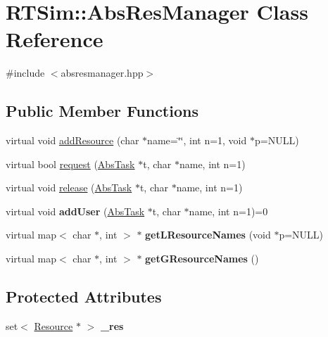 \hypertarget{classRTSim_1_1AbsResManager}{}\section{R\+T\+Sim\+:\+:Abs\+Res\+Manager Class Reference}
\label{classRTSim_1_1AbsResManager}


{\ttfamily \#include $<$absresmanager.\+hpp$>$}

\subsection*{Public Member Functions}
\begin{DoxyCompactItemize}
\item 
virtual void \hyperlink{classRTSim_1_1AbsResManager_ae4067854544315e2253f1ef5b3b10d3c}{add\+Resource} (char $\ast$name=\char`\"{}\char`\"{}, int n=1, void $\ast$p=N\+U\+LL)
\item 
virtual bool \hyperlink{classRTSim_1_1AbsResManager_aa1515da6c3b530ba663d694c693071e3}{request} (\hyperlink{classRTSim_1_1AbsTask}{Abs\+Task} $\ast$t, char $\ast$name, int n=1)
\item 
virtual void \hyperlink{classRTSim_1_1AbsResManager_a1caf3de13a3e1ac01f4f626b5ab4909d}{release} (\hyperlink{classRTSim_1_1AbsTask}{Abs\+Task} $\ast$t, char $\ast$name, int n=1)
\item 
virtual void {\bfseries add\+User} (\hyperlink{classRTSim_1_1AbsTask}{Abs\+Task} $\ast$t, char $\ast$name, int n=1)=0\hypertarget{classRTSim_1_1AbsResManager_a26c2989184847b41229aebdbc62a2ca9}{}\label{classRTSim_1_1AbsResManager_a26c2989184847b41229aebdbc62a2ca9}

\item 
virtual map$<$ char $\ast$, int $>$ $\ast$ {\bfseries get\+L\+Resource\+Names} (void $\ast$p=N\+U\+LL)\hypertarget{classRTSim_1_1AbsResManager_a1bce0b29442d317b1bdccad5e382acb6}{}\label{classRTSim_1_1AbsResManager_a1bce0b29442d317b1bdccad5e382acb6}

\item 
virtual map$<$ char $\ast$, int $>$ $\ast$ {\bfseries get\+G\+Resource\+Names} ()\hypertarget{classRTSim_1_1AbsResManager_a41f78ebcc3ff9f5c85f0a6577867beba}{}\label{classRTSim_1_1AbsResManager_a41f78ebcc3ff9f5c85f0a6577867beba}

\end{DoxyCompactItemize}
\subsection*{Protected Attributes}
\begin{DoxyCompactItemize}
\item 
set$<$ \hyperlink{classRTSim_1_1Resource}{Resource} $\ast$ $>$ {\bfseries \+\_\+res}\hypertarget{classRTSim_1_1AbsResManager_aaaf9bc5611d0fbdb4d0f6e526eb91ccf}{}\label{classRTSim_1_1AbsResManager_aaaf9bc5611d0fbdb4d0f6e526eb91ccf}

\end{DoxyCompactItemize}


